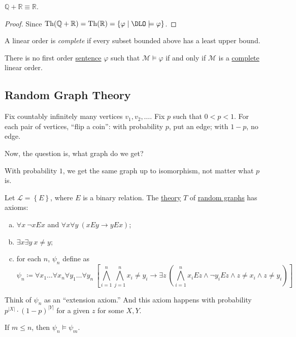 \begin{corollary}
	\(\mathbb{Q} + \mathbb{R} \equiv \mathbb{R} \).
\end{corollary}
\begin{proof}
	Since \(\mathop{\mathrm{Th}}(\mathbb{Q} + \mathbb{R} ) = \mathop{\mathrm{Th}}(\mathbb{R} ) = \left\{ \varphi \mid \DLO \models \varphi \right\}\).
\end{proof}

\begin{definition}[Complete]\label{def:linear-order-complete}
	A linear order is \emph{complete} if every subset bounded above has a least upper bound.
\end{definition}

\begin{corollary}
	There is no first order \hyperref[def:sentence]{sentence} \(\varphi \) such that \(\mathcal{M} \models \varphi \) if and only if \(\mathcal{M} \) is a \hyperref[def:linear-order-complete]{complete} linear order.
\end{corollary}

\subsection{Random Graph Theory}

\begin{definition}\label{def:random-graph}
	Fix countably infinitely many vertices \(v_1, v_2, \ldots \). Fix \(p\) such that \(0 < p < 1\). For each pair of vertices, ``flip a coin'': with probability \(p\), put an edge; with \(1-p\), no edge.
\end{definition}

Now, the question is, what graph do we get?

\begin{remark}
	With probability \(1\), we get the same graph up to isomorphism, not matter what \(p\) is.
\end{remark}

Let \(\mathcal{L} = \left\{ E \right\} \), where \(E\) is a binary relation. The \hyperref[def:theory]{theory} \(T\) of \hyperref[def:random-graph]{random graphs} has axioms:
\begin{enumerate}[(a)]
	\item \(\forall x\ \lnot xEx\) and \(\forall x \forall y\ (xEy \to yEx)\);
	\item \(\exists x \exists y\ x \neq y\);
	\item for each \(n\), \(\psi _n\) define as
	      \[
		      \psi _n \coloneqq \forall x_1 \ldots \forall x_n \forall y_1 \ldots \forall y_n\ \left[ \bigwedge_{i=1}^{n} \bigwedge_{j=1}^{n} x_i \neq y_i \to \exists z\ \left( \bigwedge_{i=1}^{n} x_i E z \land \lnot y_i E z \land z \neq x_i \land z \neq y_i \right) \right]
	      \]
\end{enumerate}

\begin{intuition}
	Think of \(\psi _n\) as an ``extension axiom.'' And this axiom happens with probability \(p^{\vert X \vert } \cdot (1 - p) ^{\vert Y \vert }\) for a given \(z\) for some \(X, Y\).
\end{intuition}

\begin{note}
	If \(m \leq n\), then \(\psi _n \models \psi _m\).
\end{note}